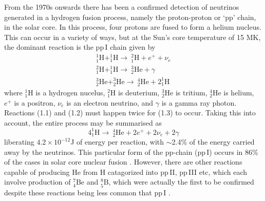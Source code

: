From the 1970s onwards there has been a confirmed detection of neutrinos generated in a hydrogen fusion process, namely the proton-proton or `pp' chain, in the solar core. In this process, four protons are fused to form a helium nucleus. This can occur in a variety of ways, but at the Sun's core temperature of 15 MK, the dominant reaction is the pp\,I chain given by
\begin{eqnarray}
^{1}_1\mathrm{H} + ^{1}_1\mathrm{H} \rightarrow ~^{2}_1\mathrm{H} + e^{+}  + \nu_e \\
%
^{2}_1\mathrm{H} + ^{1}_1\mathrm{H} \rightarrow ~^{3}_2\mathrm{He} + \gamma \\
%
^{3}_2\mathrm{He}+^{3}_2\mathrm{He} \rightarrow ~^{4}_2\mathrm{He} + 2^{1}_1\mathrm{H}
\end{eqnarray}
where $^{1}_1\mathrm{H}$ is a hydrogen nucelus, $^{2}_1\mathrm{H}$ is deuterium, $^{3}_2\mathrm{He}$ is tritium, $^{4}_2\mathrm{He}$ is helium, $e^{+}$ is a positron, $\nu_e$ is an electron neutrino, and $\gamma$ is a gamma ray photon. Reactions (1.1) and (1.2) must happen twice for (1.3) to occur. Taking this into account, the entire process may be summarised as 
\begin{equation}
4 ^{1}_1\mathrm{H}  \rightarrow ~^{4}_2\mathrm{He} + 2e^{+} + 2\nu_e + 2\gamma
\end{equation}
liberating $4.2\times10^{-12}$J of energy per reaction, with $\sim$2.4\% of the energy carried away by the neutrinos. This particular form of the pp-chain (pp\,I) occurs in 86\% of the cases in solar core nuclear fusion \citep{turk2011}. However, there are other reactions capable of producing He from H catagorized into pp\,II, pp\,III etc, which each involve production of $^7_4$Be and $^8_5$B, which were actually the first to be confirmed despite these reactions being less common that pp\,I \citep{davis1968}. 

